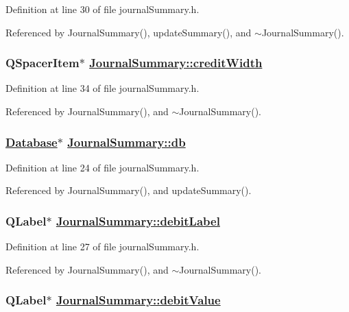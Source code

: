 Definition at line 30 of file journal\-Summary.h.

Referenced by Journal\-Summary(), update\-Summary(), and $\sim$Journal\-Summary().\hypertarget{classJournalSummary_r9}{
\subsubsection[creditWidth]{\setlength{\rightskip}{0pt plus 5cm}QSpacer\-Item$\ast$ \hyperlink{classJournalSummary_r9}{Journal\-Summary::credit\-Width}}}
\label{classJournalSummary_r9}


Definition at line 34 of file journal\-Summary.h.

Referenced by Journal\-Summary(), and $\sim$Journal\-Summary().\hypertarget{classJournalSummary_r0}{
\subsubsection[db]{\setlength{\rightskip}{0pt plus 5cm}\hyperlink{classDatabase}{Database}$\ast$ \hyperlink{classJournalSummary_r0}{Journal\-Summary::db}}}
\label{classJournalSummary_r0}


Definition at line 24 of file journal\-Summary.h.

Referenced by Journal\-Summary(), and update\-Summary().\hypertarget{classJournalSummary_r2}{
\subsubsection[debitLabel]{\setlength{\rightskip}{0pt plus 5cm}QLabel$\ast$ \hyperlink{classJournalSummary_r2}{Journal\-Summary::debit\-Label}}}
\label{classJournalSummary_r2}


Definition at line 27 of file journal\-Summary.h.

Referenced by Journal\-Summary(), and $\sim$Journal\-Summary().\hypertarget{classJournalSummary_r3}{
\subsubsection[debitValue]{\setlength{\rightskip}{0pt plus 5cm}QLabel$\ast$ \hyperlink{classJournalSummary_r3}{Journal\-Summary::debit\-Value}}}
\label{classJournalSummary_r3}


